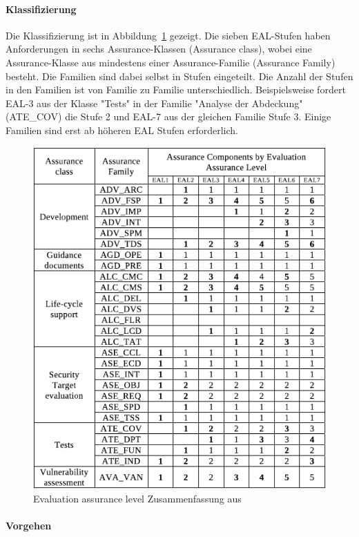 \documentclass[11pt,a4paper]{report}
\begin{document}
\paragraph{Klassifizierung}

Die Klassifizierung ist in Abbildung~\ref{fig:eal_sum} gezeigt. Die sieben EAL-Stufen haben Anforderungen in sechs Assurance-Klassen (Assurance class), wobei eine Assurance-Klasse aus mindestens einer Assurance-Familie (Assurance Family) besteht. Die Familien sind dabei selbst in Stufen eingeteilt. Die Anzahl der Stufen in den Familien ist von Familie zu Familie unterschiedlich. Beispielsweise fordert EAL-3 aus der Klasse "Tests" in der Familie "Analyse der Abdeckung" (ATE\_COV) die Stufe 2 und EAL-7 aus der gleichen Familie Stufe 3. Einige Familien sind erst ab höheren EAL Stufen erforderlich. 

\begin{figure}[htbp]
\centering
\includegraphics[scale=1]{images/cc_eal_table.pdf}
\caption[]{Evaluation assurance level Zusammenfassung aus \cite{bsi_ccguide}}
\label{fig:eal_sum}
\end{figure}

\paragraph{Vorgehen}
\end{document}
